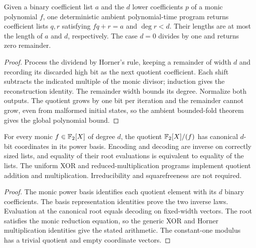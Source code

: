 \begin{lemma}
\label{lem:binary-monic-division}
\leanok
Given a binary coefficient list $a$ and the $d$ lower coefficients $p$ of a
monic polynomial $f$, one deterministic ambient polynomial-time program returns
coefficient lists $q,r$ satisfying $fq+r=a$ and $\deg r<d$. Their lengths are
at most the length of $a$ and $d$, respectively. The case $d=0$ divides by one
and returns zero remainder.
\end{lemma}
\begin{proof}
\leanok
Process the dividend by Horner's rule, keeping a remainder of width $d$ and
recording its discarded high bit as the next quotient coefficient. Each shift
subtracts the indicated multiple of the monic divisor; induction gives the
reconstruction identity. The remainder width bounds its degree. Normalize both
outputs. The quotient grows by one bit per iteration and the remainder cannot
grow, even from malformed initial states, so the ambient bounded-fold theorem
gives the global polynomial bound.
\end{proof}

\begin{lemma}
\label{lem:binary-monic-quotient}
\leanok
For every monic $f\in\mathbb{F}_2[X]$ of degree $d$, the quotient $\mathbb{F}_2[X]/(f)$ has
canonical $d$-bit coordinates in its power basis. Encoding and decoding are
inverse on correctly sized lists, and equality of their root evaluations is
equivalent to equality of the lists. The uniform XOR and reduced-multiplication
programs implement quotient addition and multiplication. Irreducibility and
squarefreeness are not required.
\end{lemma}
\begin{proof}
\leanok
The monic power basis identifies each quotient element with its $d$ binary
coefficients. The basis representation identities prove the two inverse laws.
Evaluation at the canonical root equals decoding on fixed-width vectors.
The root satisfies the monic reduction equation, so the generic XOR and Horner
multiplication identities give the stated arithmetic. The constant-one modulus
has a trivial quotient and empty coordinate vectors.
\end{proof}
